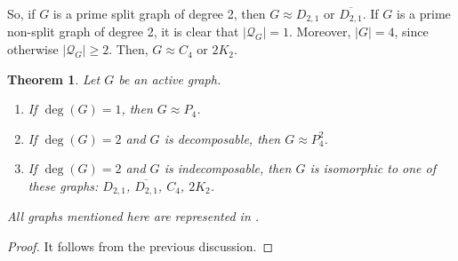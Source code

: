 \documentclass[11pt]{article}
\newtheorem{theorem}{Theorem}[section]
\begin{document}
So, if $G$ is a prime split graph of degree 2, then $G\approx D_{2,1}$ or $\overline{D_{2,1}}$. If $G$ is a prime non-split graph of degree 2, it is clear that $|\mathcal{Q}_G|=1$. Moreover, $|G|=4$, since otherwise $|\mathcal{Q}_G|\geq 2$. Then, $G\approx C_4$ or $2K_2$.

\begin{theorem}
	\label{clasificacion.activo_deg=2}
	Let $G$ be an active graph.
	\begin{enumerate}
		\item If $\deg(G)=1$, then $G \approx P_4$.
		\item If $\deg(G)=2$ and $G$ is decomposable, then $G \approx P_4^2$.
		\item If $\deg(G)=2$ and $G$ is indecomposable, then $G$ is isomorphic to one of these graphs: $D_{2,1}$, $\overline{D_{2,1}}$, $C_4$, $2K_2$.
	\end{enumerate}
	All graphs mentioned here are represented in  .
\end{theorem}

\begin{proof}
	It follows from the previous discussion.
\end{proof}
\end{document}
